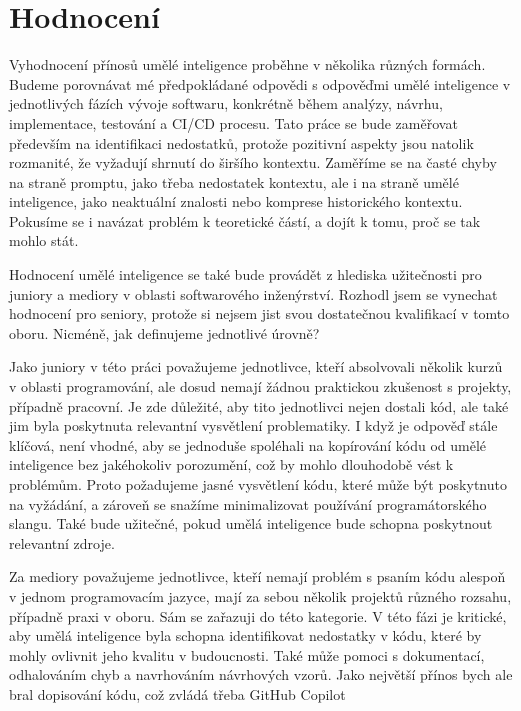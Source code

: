 \documentclass[FM,DP]{tulthesis}
\begin{document}
		\section{Hodnocení}
		Vyhodnocení přínosů umělé inteligence proběhne v několika různých formách. Budeme porovnávat mé předpokládané odpovědi s odpověďmi umělé inteligence v jednotlivých fázích vývoje softwaru, konkrétně během analýzy, návrhu, implementace, testování a CI/CD procesu. Tato práce se bude zaměřovat především na identifikaci nedostatků, protože pozitivní aspekty jsou natolik rozmanité, že vyžadují shrnutí do širšího kontextu. Zaměříme se na časté chyby na straně promptu, jako třeba nedostatek kontextu, ale i na straně umělé inteligence, jako neaktuální znalosti nebo komprese historického kontextu. Pokusíme se i navázat problém k teoretické částí, a dojít k tomu, proč se tak mohlo stát.
		
		Hodnocení umělé inteligence se také bude provádět z hlediska užitečnosti pro juniory a mediory v oblasti softwarového inženýrství. Rozhodl jsem se vynechat hodnocení pro seniory, protože si nejsem jist svou dostatečnou kvalifikací v tomto oboru. Nicméně, jak definujeme jednotlivé úrovně?
		
		Jako juniory v této práci považujeme jednotlivce, kteří absolvovali několik kurzů v oblasti programování, ale dosud nemají žádnou praktickou zkušenost s projekty, případně pracovní. Je zde důležité, aby tito jednotlivci nejen dostali kód, ale také jim byla poskytnuta relevantní vysvětlení problematiky. I když je odpověď stále klíčová, není vhodné, aby se jednoduše spoléhali na kopírování kódu od umělé inteligence bez jakéhokoliv porozumění, což by mohlo dlouhodobě vést k problémům. Proto požadujeme jasné vysvětlení kódu, které může být poskytnuto na vyžádání, a zároveň se snažíme minimalizovat používání programátorského slangu. Také bude užitečné, pokud umělá inteligence bude schopna poskytnout relevantní zdroje.
		
		Za mediory považujeme jednotlivce, kteří nemají problém s psaním kódu alespoň v jednom programovacím jazyce, mají za sebou několik projektů různého rozsahu, případně praxi v oboru. Sám se zařazuji do této kategorie. V této fázi je kritické, aby umělá inteligence byla schopna identifikovat nedostatky v kódu, které by mohly ovlivnit jeho kvalitu v budoucnosti. Také může pomoci s dokumentací, odhalováním chyb a navrhováním návrhových vzorů. Jako největší přínos bych ale bral dopisování kódu, což zvládá třeba GitHub Copilot \cite{gitCopilot}
		
\end{document}
